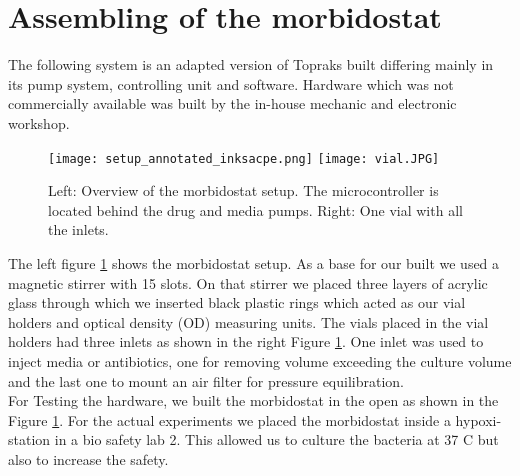 \section{Assembling of the morbidostat}
The following system is an adapted version of Topraks built differing mainly in its pump system, controlling unit and software. Hardware which was not commercially available was built by the in-house mechanic and electronic workshop.

\begin{figure}
	\texttt{[image: setup\_annotated\_inksacpe.png]}
	\texttt{[image: vial.JPG]}
	\caption{Left: Overview of the morbidostat setup. The microcontroller is located behind the drug and media pumps. Right: One vial with all the inlets.}
	\label{figure:morbidostat_setup}
\end{figure}  
The left figure \ref{figure:morbidostat_setup} shows the morbidostat setup.
As a base for our built we used a magnetic stirrer with 15 slots. On that stirrer we placed three layers of acrylic glass through which we inserted black plastic rings which acted as our vial holders and optical density (OD) measuring units. 
The vials placed in the vial holders had three inlets as shown in the right Figure \ref{figure:morbidostat_setup}. One inlet was used to inject media or antibiotics, one for removing volume exceeding the culture volume and the last one to mount an air filter for pressure equilibration. \\
For Testing the hardware, we built the morbidostat in the open as shown in the Figure \ref{figure:morbidostat_setup}. For the actual experiments we placed the morbidostat inside a hypoxi-station in a bio safety lab 2. This allowed us to culture the bacteria at 37 \degree C but also to increase the safety. 


